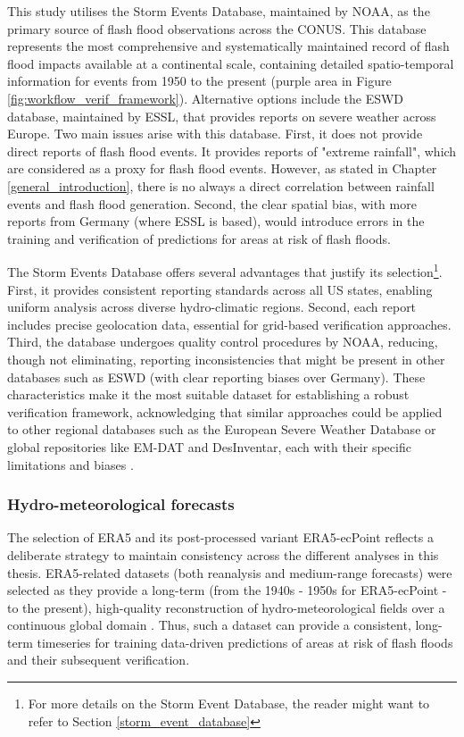 This study utilises the Storm Events Database, maintained by NOAA, as the primary source of flash flood observations across the CONUS. This database represents the most comprehensive and systematically maintained record of flash flood impacts available at a continental scale, containing detailed spatio-temporal information for events from 1950 to the present (purple area in Figure \ref{fig:workflow_verif_framework}). Alternative options include the ESWD database, maintained by ESSL, that provides reports on severe weather across Europe. Two main issues arise with this database. First, it does not provide direct reports of flash flood events. It provides reports of "extreme rainfall", which are considered as a proxy for flash flood events. However, as stated in Chapter \ref{general_introduction}, there is no always a direct correlation between rainfall events and flash flood generation. Second, the clear spatial bias, with more reports from Germany (where ESSL is based), would introduce errors in the training and verification of predictions for areas at risk of flash floods.

The Storm Events Database offers several advantages that justify its selection\footnote{For more details on the Storm Event Database, the reader might want to refer to Section \ref{storm_event_database}}. First, it provides consistent reporting standards across all US states, enabling uniform analysis across diverse hydro-climatic regions. Second, each report includes precise geolocation data, essential for grid-based verification approaches. Third, the database undergoes quality control procedures by NOAA, reducing, though not eliminating, reporting inconsistencies that might be present in other databases such as ESWD (with clear reporting biases over Germany). These characteristics make it the most suitable dataset for establishing a robust verification framework, acknowledging that similar approaches could be applied to other regional databases such as the European Severe Weather Database or global repositories like EM-DAT and DesInventar, each with their specific limitations and biases \citep{Panwar_2020}.

\subsubsection{Hydro-meteorological forecasts}

The selection of ERA5 and its post-processed variant ERA5-ecPoint reflects a deliberate strategy to maintain consistency across the different analyses in this thesis. ERA5-related datasets (both reanalysis and medium-range forecasts) were selected as they provide a long-term (from the 1940s - 1950s for ERA5-ecPoint - to the present), high-quality reconstruction of hydro-meteorological fields over a continuous global domain \citep{Hersbach_2020}. Thus, such a dataset can provide a consistent, long-term timeseries for training data-driven predictions of areas at risk of flash floods and their subsequent verification.

